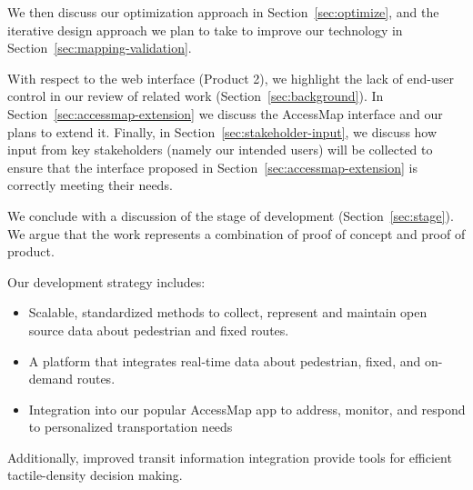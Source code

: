 We then discuss our
optimization approach in Section~\ref{sec:optimize}, and the iterative
design approach we plan to take to improve our technology in
Section~\ref{sec:mapping-validation}.

With respect to the web interface (Product 2), we highlight the lack
of end-user control in our review of related work
(Section~\ref{sec:background}). In
Section~\ref{sec:accessmap-extension} we discuss the AccessMap
interface and our plans to extend it. Finally, in Section~\ref{sec:stakeholder-input}, we discuss how input
from key stakeholders (namely our intended users) will be collected to
ensure that the interface proposed in
Section~\ref{sec:accessmap-extension} is correctly meeting their
needs.

We conclude with a discussion of the stage of development
(Section~\ref{sec:stage}). We argue that the work represents a
combination of proof of concept and proof of product. 

Our development strategy includes:
\begin{itemize}
    \item Scalable, standardized methods to collect, represent and maintain open source data about pedestrian and fixed routes.
    \item A platform that integrates real-time data about pedestrian, fixed, and on-demand routes.
    \item Integration into our popular AccessMap app to address, monitor, and respond to personalized transportation needs
\end{itemize}
 Additionally, improved transit information integration provide tools for efficient tactile-density decision making.

\begin{comment}
Our commitment to maintain all foundational work open and shared, including software, data, and standards, facilitates adoption by other parties to leverage our work and build additional tools to support any population of interest.
\end{comment}






